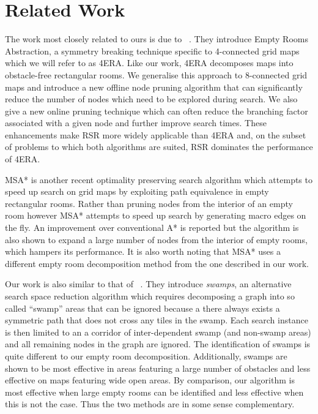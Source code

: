 \section{Related Work}
The work most closely related to ours is due to
\citeauthor{harabor10}~. They introduce Empty Rooms
Abstraction, a symmetry breaking technique specific to 4-connected grid maps
which we will refer to as 4ERA.
Like our work, 4ERA decomposes maps into obstacle-free rectangular rooms.
We generalise this approach to 8-connected grid maps and introduce a new 
offline node pruning algorithm that can significantly 
reduce the number of nodes which need to be explored during search.
We also give a new online pruning technique which can often reduce the
branching factor associated with a given node and further improve search times.
These enhancements make RSR more widely applicable than 4ERA and, 
on the subset of problems to which both algorithms are suited, 
RSR dominates the performance of 4ERA. 
\par
MSA* \cite{bolanca09} is another recent optimality preserving search algorithm which attempts to speed up search 
on grid maps by exploiting path equivalence in empty rectangular rooms. 
Rather than pruning nodes from the interior of an empty room however MSA* attempts to speed up 
search by generating macro edges on the fly.
An improvement over conventional A* is reported but the algorithm is also
shown to expand a large number of nodes from the interior of empty rooms, which hampers its performance.
It is also worth noting that MSA* uses a different empty room decomposition method
from the one described in our work.
\par
Our work is also similar to that of \citeauthor{pochter10}~. 
They introduce \emph{swamps}, an alternative search space reduction algorithm
which requires decomposing a graph into so called ``swamp'' areas that can be 
ignored because a there always exists a symmetric path that does not cross any 
tiles in the swamp. 
Each search instance is then limited to an a corridor of inter-dependent 
swamp (and non-swamp areas) and all remaining nodes in the graph are ignored.
The identification of swamps is quite different to our empty room decomposition.
Additionally, swamps are shown to be most effective in areas featuring a large number of obstacles 
and less effective on maps featuring wide open areas.
By comparison, our algorithm is most effective when large empty rooms can be identified and less
effective when this is not the case.
Thus the two methods are in some sense complementary.
